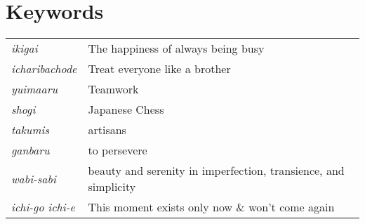 \section*{Keywords}
\begin{tabular}{ l l }
    \textit{ikigai} & The happiness of always being busy \\ 
    \textit{icharibachode} & Treat everyone like a brother \\  
    \textit{yuimaaru} & Teamwork \\
    \textit{shogi} & Japanese Chess \\
    \textit{takumis} & artisans \\
    \textit{ganbaru} & to persevere \\
    \textit{wabi-sabi} & beauty and serenity in imperfection, transience, and simplicity \\
    \textit{ichi-go ichi-e} & This moment exists only now \& won't come again \\
\end{tabular}
